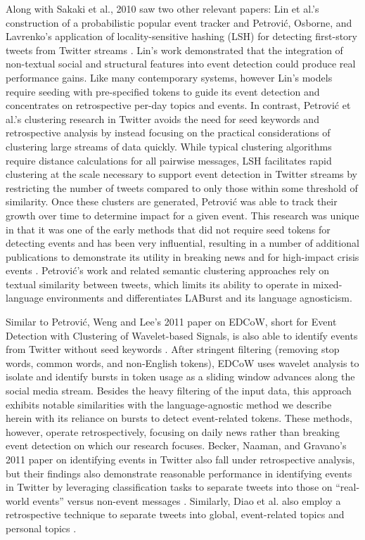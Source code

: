 \documentclass[letterpaper]{article}
\begin{document}
Along with Sakaki et al., 2010 saw two other relevant papers: Lin et al.'s construction of a probabilistic popular event tracker \cite{Lin:2010:PSM:1835804.1835922} and Petrovi\'{c}, Osborne, and Lavrenko's application of locality-sensitive hashing (LSH) for detecting first-story tweets from Twitter streams \cite{Petrovic:2010:SFS:1857999.1858020}.
Lin's work demonstrated that the integration of non-textual social and structural features into event detection could produce real performance gains.
Like many contemporary systems, however Lin's models require seeding with pre-specified tokens to guide its event detection and concentrates on retrospective per-day topics and events.
In contrast, Petrovi\'{c} et al.'s clustering research in Twitter avoids the need for seed keywords and retrospective analysis by instead focusing on the practical considerations of clustering large streams of data quickly.
While typical clustering algorithms require distance calculations for all pairwise messages, LSH facilitates rapid clustering at the scale necessary to support event detection in Twitter streams by restricting the number of tweets compared to only those within some threshold of similarity.
Once these clusters are generated, Petrovi\'{c} was able to track their growth over time to determine impact for a given event.
This research was unique in that it was one of the early methods that did not require seed tokens for detecting events and has been very influential, resulting in a number of additional publications to demonstrate its utility in breaking news and for high-impact crisis events \cite{osborne2014real,petrovic2013can,6601695}.
Petrovi\'{c}'s work and related semantic clustering approaches rely on textual similarity between tweets, which limits its ability to operate in mixed-language environments and differentiates LABurst and its language agnosticism.

Similar to Petrovi\'{c}, Weng and Lee's 2011 paper on EDCoW, short for Event Detection with Clustering of Wavelet-based Signals, is also able to identify events from Twitter without seed keywords \cite{weng2011event}.
After stringent filtering (removing stop words, common words, and non-English tokens), EDCoW uses wavelet analysis to isolate and identify bursts in token usage as a sliding window advances along the social media stream.
Besides the heavy filtering of the input data, this approach exhibits notable similarities with the language-agnostic method we describe herein with its reliance on bursts to detect event-related tokens.
These methods, however, operate retrospectively, focusing on daily news rather than breaking event detection on which our research focuses.
Becker, Naaman, and Gravano's 2011 paper on identifying events in Twitter also fall under retrospective analysis, but their findings also demonstrate reasonable performance in identifying events in Twitter by leveraging classification tasks to separate tweets into those on ``real-world events'' versus non-event messages \cite{becker2011beyond}.
Similarly, Diao et al. also employ a retrospective technique to separate tweets into global, event-related topics and personal topics \cite{diao2012finding}.
\end{document}
